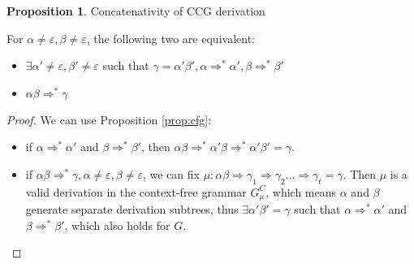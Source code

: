 \documentclass[12pt]{extarticle}
\theoremstyle{definition} \newtheorem{defn}{Definition}
\theoremstyle{definition} \newtheorem{prop}{Proposition}
\theoremstyle{definition} \newtheorem{property}{Property}
\begin{document}
\begin{prop}\label{prop:concat}
    Concatenativity of CCG derivation

    For $\alpha \neq \varepsilon, \beta \neq \varepsilon$, the following two are equivalent:
    \begin{itemize}

        \item $\exists \alpha' \neq \varepsilon, \beta' \neq \varepsilon$
            such that $\gamma = \alpha' \beta', \alpha \Rightarrow^* \alpha', \beta \Rightarrow^* \beta'$
        \item $\alpha \beta \Rightarrow^* \gamma$
    \end{itemize}
\end{prop}
\begin{proof}
    We can use Proposition \ref{prop:cfg}:

    \begin{itemize}
        \item if $\alpha \Rightarrow^* \alpha'$ and $\beta \Rightarrow^* \beta'$,
            then $\alpha \beta \Rightarrow^* \alpha' \beta \Rightarrow^* \alpha' \beta' = \gamma$.
        \item if $\alpha \beta \Rightarrow^* \gamma, \alpha \neq \varepsilon, \beta \neq \varepsilon$,
            we can fix $\mu: \alpha \beta \Rightarrow \gamma_1 \Rightarrow \gamma_2 ... \Rightarrow \gamma_t = \gamma$.
            Then $\mu$ is a valid derivation in the context-free grammar $G^C_{\mu}$,
            which means $\alpha$ and $\beta$ generate separate derivation
            subtrees, thus $\exists \alpha' \beta' = \gamma$ such that
            $\alpha \Rightarrow^* \alpha'$ and $\beta \Rightarrow^* \beta'$,
            which also holds for $G$.
    \end{itemize}
\end{proof}
\end{document}
